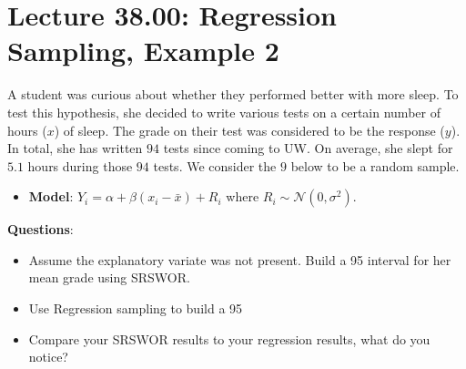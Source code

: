 \documentclass[oneside]{book}\usepackage[]{graphicx}\usepackage[dvipsnames,table,xcdraw]{xcolor}
\begin{document}
\section{Lecture 38.00: Regression Sampling, Example 2}
A student was curious about whether they performed better with
more sleep. To test this hypothesis, she decided to write
various tests on a certain number of hours ($x$) of sleep.
The grade on their test was considered to be the response ($y$).
In total, she has written $94$ tests since coming to UW.
On average, she slept for $5.1$ hours during those $94$
tests. We consider the $9$ below to be a random sample.
\begin{itemize}
    \item \textbf{Model}: $Y_i=\alpha+\beta(x_i-\bar{x})+R_i$ where $R_i \sim \mathcal{N}(0,\sigma^2)$.
\end{itemize}
\textbf{Questions}:
\begin{itemize}
    \item Assume the explanatory variate was not present. Build a 95%
          interval for her mean grade using SRSWOR.
    \item Use Regression sampling to build a 95%
    \item Compare your SRSWOR results to your regression results, what do you notice?
\end{itemize}
\end{document}
